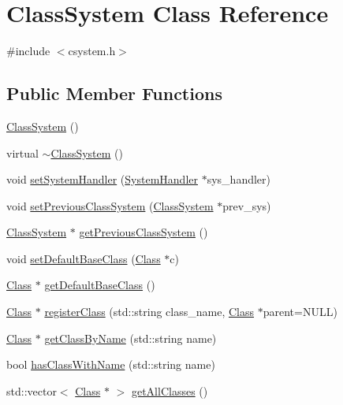 \hypertarget{classClassSystem}{}\section{Class\+System Class Reference}
\label{classClassSystem}


{\ttfamily \#include $<$csystem.\+h$>$}

\subsection*{Public Member Functions}
\begin{DoxyCompactItemize}
\item 
\hyperlink{classClassSystem_aaaec70fea8c72ed8c47bfb4de3fc4b46}{Class\+System} ()
\item 
virtual \hyperlink{classClassSystem_a9b1842899a13f28ca47cf24287dc0616}{$\sim$\+Class\+System} ()
\item 
void \hyperlink{classClassSystem_abe7eb559b5291d324cb055c89e80b180}{set\+System\+Handler} (\hyperlink{classSystemHandler}{System\+Handler} $\ast$sys\+\_\+handler)
\item 
void \hyperlink{classClassSystem_a8bda9472a03697e442079606aa51c4fc}{set\+Previous\+Class\+System} (\hyperlink{classClassSystem}{Class\+System} $\ast$prev\+\_\+sys)
\item 
\hyperlink{classClassSystem}{Class\+System} $\ast$ \hyperlink{classClassSystem_a32c4883e03da6a11ab11f2f39afc073a}{get\+Previous\+Class\+System} ()
\item 
void \hyperlink{classClassSystem_a10283c2e4e7cc89b213f6a32a0d709c1}{set\+Default\+Base\+Class} (\hyperlink{classClass}{Class} $\ast$c)
\item 
\hyperlink{classClass}{Class} $\ast$ \hyperlink{classClassSystem_add1ff8eadba3826024e68c836af28250}{get\+Default\+Base\+Class} ()
\item 
\hyperlink{classClass}{Class} $\ast$ \hyperlink{classClassSystem_a02f4790dd9b8fa8808a4e17f1e152281}{register\+Class} (std\+::string class\+\_\+name, \hyperlink{classClass}{Class} $\ast$parent=N\+U\+LL)
\item 
\hyperlink{classClass}{Class} $\ast$ \hyperlink{classClassSystem_a4b88087eed035dc1f6100850c933ae84}{get\+Class\+By\+Name} (std\+::string name)
\item 
bool \hyperlink{classClassSystem_aa3e6fdac5739091d3f48dbe2b8c9db46}{has\+Class\+With\+Name} (std\+::string name)
\item 
std\+::vector$<$ \hyperlink{classClass}{Class} $\ast$ $>$ \hyperlink{classClassSystem_a48c2178d336945f82ccd5b6be1539256}{get\+All\+Classes} ()
\end{DoxyCompactItemize}
